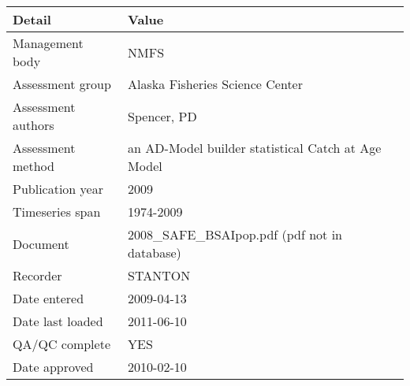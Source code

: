 \begin{table}[htb]
\centering
\begin{tabular}{lp{7cm}}
\toprule
Detail & Value \\
\midrule
Management body    & NMFS                                               \\
Assessment group   & Alaska Fisheries Science Center                    \\
Assessment authors & Spencer, PD                                        \\
Assessment method  & an AD-Model builder statistical Catch at Age Model \\
Publication year   & 2009                                               \\
Timeseries span    & 1974-2009                                          \\
Document           & 2008\_SAFE\_BSAIpop.pdf (pdf not in database)      \\
Recorder           & STANTON                                            \\
Date entered       & 2009-04-13                                         \\
Date last loaded   & 2011-06-10                                         \\
QA/QC complete     & YES                                                \\
Date approved      & 2010-02-10                                         \\
\bottomrule
\end{tabular}
\label{tab:assessdet}
\end{table}
